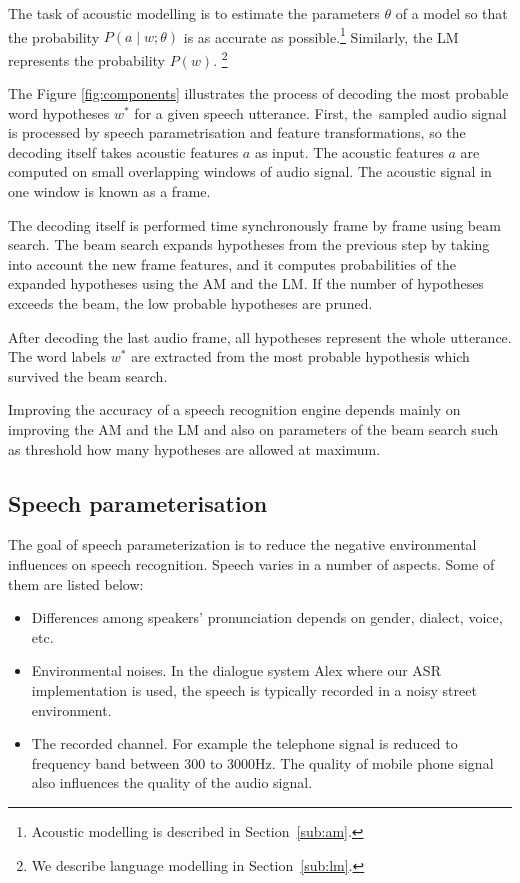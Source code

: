 The task of acoustic modelling is to estimate the parameters $\theta$ of a model so that the probability $P(a \mid w ; \theta)$ is as accurate as possible.\footnote{Acoustic modelling is described in Section~\ref{sub:am}.} Similarly, the \ac{LM} represents the probability $P(w)$. \footnote{We describe language modelling in Section~\ref{sub:lm}.}

The Figure \ref{fig:components} illustrates the process of decoding the most probable word hypotheses $w^*$ for a given speech utterance. 
First, the~sampled audio signal is processed by speech parametrisation and feature transformations, so the decoding itself takes acoustic features $a$ as input. The acoustic features $a$ are computed on small overlapping windows of audio signal. The acoustic signal in one window is known as a frame.

The decoding itself is performed time synchronously frame by frame using beam search. The beam search expands hypotheses from the previous step by taking into account the new frame features, and it computes probabilities of the expanded hypotheses using the \ac{AM} and the \ac{LM}. If the number of hypotheses exceeds the beam, the low probable hypotheses are pruned. %

After decoding the last audio frame, all hypotheses represent the whole utterance. The word labels $w^*$ are extracted from the most probable hypothesis which survived the beam search.

Improving the accuracy of a speech recognition engine depends mainly on improving the \ac{AM} and the \ac{LM} and also on parameters of the beam search such as threshold how many hypotheses are allowed at maximum.


\subsection{Speech parameterisation}
\label{sub:param}
The goal of speech parameterization is to reduce the negative environmental influences on speech recognition. Speech varies in a number of aspects. Some of them are listed below:

\begin{itemize}
\item Differences among speakers' pronunciation depends on gender, dialect, voice, etc.
\item Environmental noises. In the dialogue system Alex where our \ac{ASR} implementation is used, the speech is typically recorded in a noisy street environment.
\item The recorded channel.
  For example the telephone signal is reduced to frequency band between 300 to 3000Hz.
  The quality of mobile phone signal also influences the quality of the audio signal.
\end{itemize}

